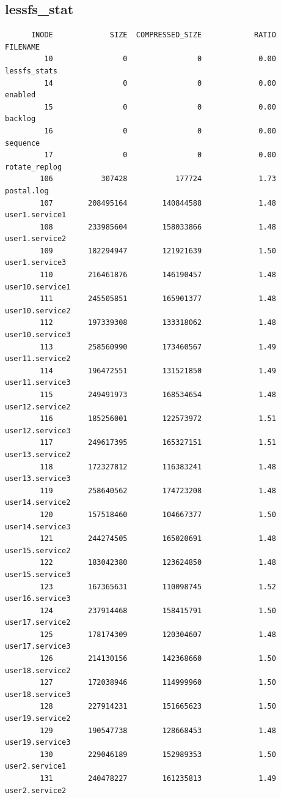 \documentclass[a4paper]{report}
\begin{document}
\subsection{lessfs_stat}
  \begin{lstlisting}
	  INODE             SIZE  COMPRESSED_SIZE            RATIO  FILENAME
	     10                0                0             0.00  lessfs_stats
	     14                0                0             0.00  enabled
	     15                0                0             0.00  backlog
	     16                0                0             0.00  sequence
	     17                0                0             0.00  rotate_replog
	    106           307428           177724             1.73  postal.log
	    107        208495164        140844588             1.48  user1.service1
	    108        233985604        158033866             1.48  user1.service2
	    109        182294947        121921639             1.50  user1.service3
	    110        216461876        146190457             1.48  user10.service1
	    111        245505851        165901377             1.48  user10.service2
	    112        197339308        133318062             1.48  user10.service3
	    113        258560990        173460567             1.49  user11.service2
	    114        196472551        131521850             1.49  user11.service3
	    115        249491973        168534654             1.48  user12.service2
	    116        185256001        122573972             1.51  user12.service3
	    117        249617395        165327151             1.51  user13.service2
	    118        172327812        116383241             1.48  user13.service3
	    119        258640562        174723208             1.48  user14.service2
	    120        157518460        104667377             1.50  user14.service3
	    121        244274505        165020691             1.48  user15.service2
	    122        183042380        123624850             1.48  user15.service3
	    123        167365631        110098745             1.52  user16.service3
	    124        237914468        158415791             1.50  user17.service2
	    125        178174309        120304607             1.48  user17.service3
	    126        214130156        142368660             1.50  user18.service2
	    127        172038946        114999960             1.50  user18.service3
	    128        227914231        151665623             1.50  user19.service2
	    129        190547738        128668453             1.48  user19.service3
	    130        229046189        152989353             1.50  user2.service1
	    131        240478227        161235813             1.49  user2.service2

\end{lstlisting}
\end{document}
